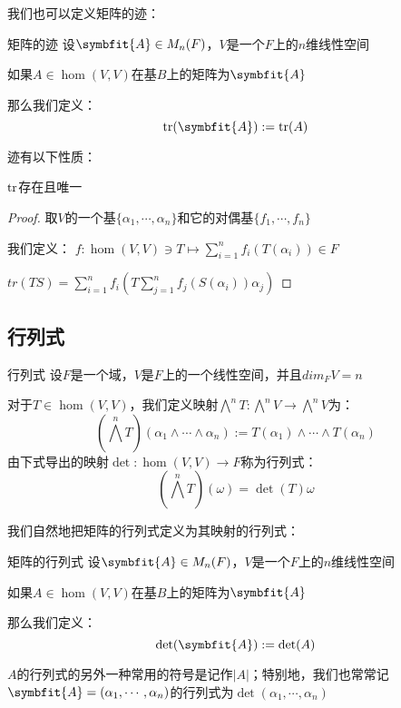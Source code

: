 \documentclass[12pt, a4paper, oneside, UTF8]{ctexbook}
\begin{document}
			我们也可以定义矩阵的迹：
			\begin{defn}{矩阵的迹}{}
				设$\symbfit{A} \in M_n(F)$，$V$是一个$F$上的$n$维线性空间

				如果$A \in \hom(V,V)$在基$B$上的矩阵为$\symbfit{A}$

				那么我们定义：
				\begin{equation}
					\tr(\symbfit{A}):=\tr(A)
				\end{equation}
			\end{defn}

			迹有以下性质：
			\begin{para}{0}
				\point{}
					\begin{proposition}
						$\operatorname{tr}$存在且唯一
					\end{proposition}
					\begin{proof}
						取$V$的一个基$\{\alpha_1,\cdots,\alpha_n\}$和它的对偶基$\{f_1,\cdots,f_n\}$

						我们定义：
						$f:\hom(V,V) \ni T \mapsto \sum\limits_{i=1}^{n} f_i\left(T(\alpha_i)\right) \in F$
					
						$tr(TS)=\sum\limits_{i=1}^{n} f_i\left(T\sum\limits_{j=1}^{n}f_j(S(\alpha_i))\alpha_j\right)$
					
					\end{proof}
			\end{para}
		\subsection{行列式}
			\begin{defn}{行列式}{}
				设$F$是一个域，$V$是$F$上的一个线性空间，并且$dim_F V = n$

				对于$T\in\hom(V,V)$，我们定义映射$\bigwedge^n T:\bigwedge^n V \to \bigwedge^n V$为：
				\begin{equation}
					\left(\bigwedge^n T\right)(\alpha_1 \wedge \cdots \wedge \alpha_n):= T(\alpha_1) \wedge \cdots \wedge T(\alpha_n)
				\end{equation}
				由下式导出的映射$\det: \hom(V,V) \rightarrow F$称为行列式：
				\begin{equation}
					\left(\bigwedge^n T\right)(\omega )=\det(T)\omega 
				\end{equation}
			\end{defn}
			我们自然地把矩阵的行列式定义为其映射的行列式：
			\begin{defn}{矩阵的行列式}{}
				设$\symbfit{A} \in M_n(F)$，$V$是一个$F$上的$n$维线性空间

				如果$A \in \hom(V,V)$在基$B$上的矩阵为$\symbfit{A}$

				那么我们定义：
				\begin{equation}
					\det(\symbfit{A}):=\det(A)
				\end{equation}
			\end{defn}
			$A$的行列式的另外一种常用的符号是记作$|A|$；特别地，我们也常常记$\symbfit{A}=(\alpha_1,\cdots,\alpha_n)$的行列式为$\det(\alpha_1,\cdots,\alpha_n)$
\end{document}
